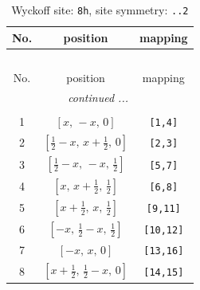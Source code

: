 \documentclass[fleqn,8pt]{jsarticle}
\begin{document}
\begin{longtable}{ccc}
\caption{Wyckoff site: {\tt 8h}, site symmetry: {\tt ..2}}
 \\
 \hline \hline
No. & position & mapping \\ \hline \endfirsthead

\multicolumn{2}{l}{\tablename\ \thetable{}} \\
 \hline \hline
No. & position & mapping \\ \hline \endhead

 \hline \hline
\multicolumn{2}{r}{\footnotesize\it continued ...} \\ \endfoot

 \hline \hline
\multicolumn{2}{r}{} \\ \endlastfoot

1 & $\left[ x,\, - x,\, 0 \right]$ & {\tt [1,4]} \\ \hline
2 & $\left[ \frac{1}{2} - x,\, x + \frac{1}{2},\, 0 \right]$ & {\tt [2,3]} \\ \hline
3 & $\left[ \frac{1}{2} - x,\, - x,\, \frac{1}{2} \right]$ & {\tt [5,7]} \\ \hline
4 & $\left[ x,\, x + \frac{1}{2},\, \frac{1}{2} \right]$ & {\tt [6,8]} \\ \hline
5 & $\left[ x + \frac{1}{2},\, x,\, \frac{1}{2} \right]$ & {\tt [9,11]} \\ \hline
6 & $\left[ - x,\, \frac{1}{2} - x,\, \frac{1}{2} \right]$ & {\tt [10,12]} \\ \hline
7 & $\left[ - x,\, x,\, 0 \right]$ & {\tt [13,16]} \\ \hline
8 & $\left[ x + \frac{1}{2},\, \frac{1}{2} - x,\, 0 \right]$ & {\tt [14,15]} \\
\end{longtable}
\renewcommand{\arraystretch}{1.2}
\end{document}
